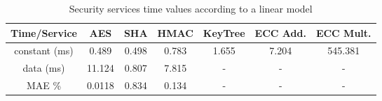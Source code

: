 \begin{table}[h!]
\centering
\def\arraystretch{1.5}
\begin{tabular}{|c|c|c|c|c|c|c|}
\hline
Time/Service   & AES     & SHA    & HMAC    & KeyTree & ECC Add. & ECC Mult.   \\ \hline
constant (ms) & 0.489  & 0.498  & 0.783   & 1.655   & 7.204   & 545.381 \\ \hline
data (ms) & 11.124  & 0.807 & 7.815   & -       & -       & -      \\ \hline
MAE \%	   & 0.0118  & 0.834  & 0.134   & -	  & -	    & -   \\ \hline
\end{tabular}
\caption{Security services time values according to a linear model}
\label{tab:core-model}
\end{table}
